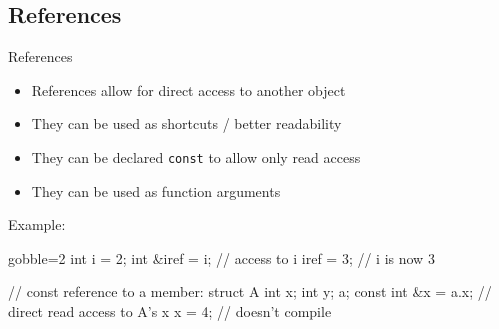 \subsection[Refs]{References}

\begin{frame}[fragile]
  \begin{block}{References}
    \begin{itemize}
      \item References allow for direct access to another object
      \item They can be used as shortcuts / better readability
      \item They can be declared \texttt{const} to allow only read access
      \item They can be used as function arguments
    \end{itemize}
  \end{block}

  \begin{exampleblock}{Example:}
    \begin{cppcode*}{gobble=2}
      int i = 2;
      int &iref = i; // access to i
      iref = 3;      // i is now 3

      // const reference to a member:
      struct A { int x; int y; } a;
      const int &x = a.x; // direct read access to A's x
      x = 4;              // doesn't compile
    \end{cppcode*}
  \end{exampleblock}
\end{frame}

